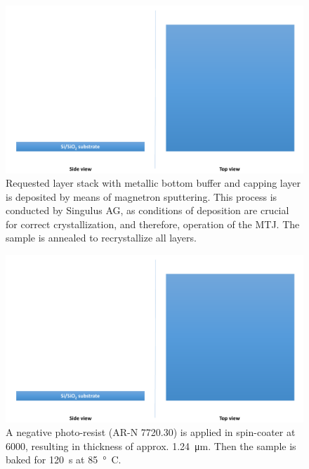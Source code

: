 \begin{multicols}{2}[]
    
    \begin{figure}[H]
        \centering
        \includegraphics[width=0.375\paperwidth, page=3]{img/04/Manufacturing_under.pdf}
        \caption{Requested layer stack with metallic bottom buffer and capping layer is deposited by means of magnetron sputtering. This process is conducted by Singulus AG, as conditions of deposition are crucial for correct crystallization, and therefore, operation of the MTJ. The sample is annealed to recrystallize all layers.}
        \label{FabricationStack}
    \end{figure}
    
    \begin{figure}[H]
        \centering
        \includegraphics[width=0.375\paperwidth, page=4]{img/04/Manufacturing_under.pdf}
        \caption{A negative photo-resist (AR-N 7720.30) is applied in spin-coater at \SI{6000}{\rpm}, resulting in thickness of approx. \SI{1.24}{\micro\meter}. Then the sample is baked for \SI{120}{\second} at \SI{85}{\degree C}.}
        \label{FabricationBottomResist}
    \end{figure}
    
\end{multicols}
